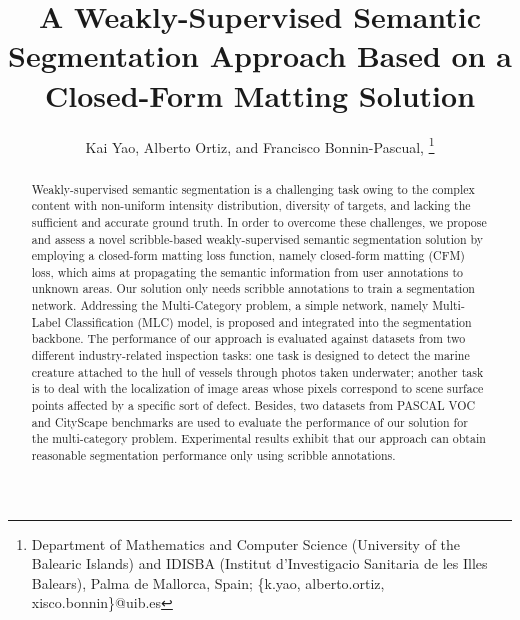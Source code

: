 \documentclass[journal]{IEEEtran}
\begin{document}
    \title{A Weakly-Supervised Semantic Segmentation Approach Based on a Closed-Form Matting Solution}
   	\author{Kai Yao, Alberto Ortiz, and Francisco Bonnin-Pascual,
\thanks{Department of Mathematics and Computer Science (University of the Balearic Islands) and IDISBA (Institut d'Investigacio Sanitaria de les Illes Balears), Palma de Mallorca, Spain; \{k.yao, alberto.ortiz, xisco.bonnin\}@uib.es}}
\maketitle


\begin{abstract}
Weakly-supervised semantic segmentation is a challenging task owing to the complex content with non-uniform intensity distribution, diversity of targets, and lacking the sufficient and accurate ground truth. In order to overcome these challenges, we propose and assess a novel scribble-based weakly-supervised semantic segmentation solution by employing a closed-form matting loss function, namely closed-form matting (CFM) loss, which aims at propagating the semantic information from user annotations to unknown areas. Our solution only needs scribble annotations to train a segmentation network. Addressing the Multi-Category problem, a simple network, namely Multi-Label Classification (MLC) model, is proposed and integrated into the segmentation backbone. The performance of our approach is evaluated against datasets from two different industry-related inspection tasks: one task is designed to detect the marine creature attached to the hull of vessels through photos taken underwater; another task is to deal with the localization of image areas whose pixels correspond to scene surface points affected by a specific sort of defect. Besides, two datasets from PASCAL VOC and CityScape benchmarks are used to evaluate the performance of our solution for the multi-category problem. Experimental results exhibit that our approach can obtain reasonable segmentation performance only using scribble annotations.
\end{abstract}
\end{document}
